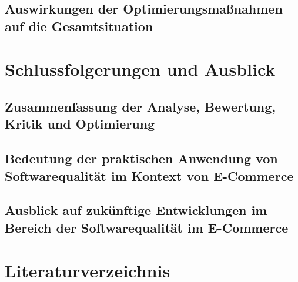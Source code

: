 \documentclass{article}
\begin{document}
\subsection{Auswirkungen der Optimierungsmaßnahmen auf die Gesamtsituation}

\section{Schlussfolgerungen und Ausblick}
\subsection{Zusammenfassung der Analyse, Bewertung, Kritik und Optimierung}
\subsection{Bedeutung der praktischen Anwendung von Softwarequalität im Kontext von E-Commerce}
\subsection{Ausblick auf zukünftige Entwicklungen im Bereich der Softwarequalität im E-Commerce}

\section{Literaturverzeichnis}
\end{document}
